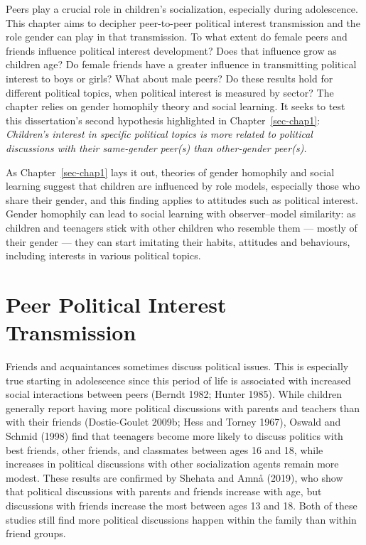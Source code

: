 \documentclass[
  letterpaper,
  DIV=11,
  numbers=noendperiod]{scrreprt}
\begin{document}
Peers play a crucial role in children's socialization, especially during
adolescence. This chapter aims to decipher peer-to-peer political
interest transmission and the role gender can play in that transmission.
To what extent do female peers and friends influence political interest
development? Does that influence grow as children age? Do female friends
have a greater influence in transmitting political interest to boys or
girls? What about male peers? Do these results hold for different
political topics, when political interest is measured by sector? The
chapter relies on gender homophily theory and social learning. It seeks
to test this dissertation's second hypothesis highlighted in
Chapter~\ref{sec-chap1}: \emph{Children's interest in specific political
topics is more related to political discussions with their same-gender
peer(s) than other-gender peer(s).}

As Chapter~\ref{sec-chap1} lays it out, theories of gender homophily and
social learning suggest that children are influenced by role models,
especially those who share their gender, and this finding applies to
attitudes such as political interest. Gender homophily can lead to
social learning with observer--model similarity: as children and
teenagers stick with other children who resemble them --- mostly of
their gender --- they can start imitating their habits, attitudes and
behaviours, including interests in various political topics.

\section{Peer Political Interest
Transmission}\label{peer-political-interest-transmission}

Friends and acquaintances sometimes discuss political issues. This is
especially true starting in adolescence since this period of life is
associated with increased social interactions between peers (Berndt
1982; Hunter 1985). While children generally report having more
political discussions with parents and teachers than with their friends
(Dostie-Goulet 2009b; Hess and Torney 1967), Oswald and Schmid (1998)
find that teenagers become more likely to discuss politics with best
friends, other friends, and classmates between ages 16 and 18, while
increases in political discussions with other socialization agents
remain more modest. These results are confirmed by Shehata and Amnå
(2019), who show that political discussions with parents and friends
increase with age, but discussions with friends increase the most
between ages 13 and 18. Both of these studies still find more political
discussions happen within the family than within friend groups.
\end{document}
